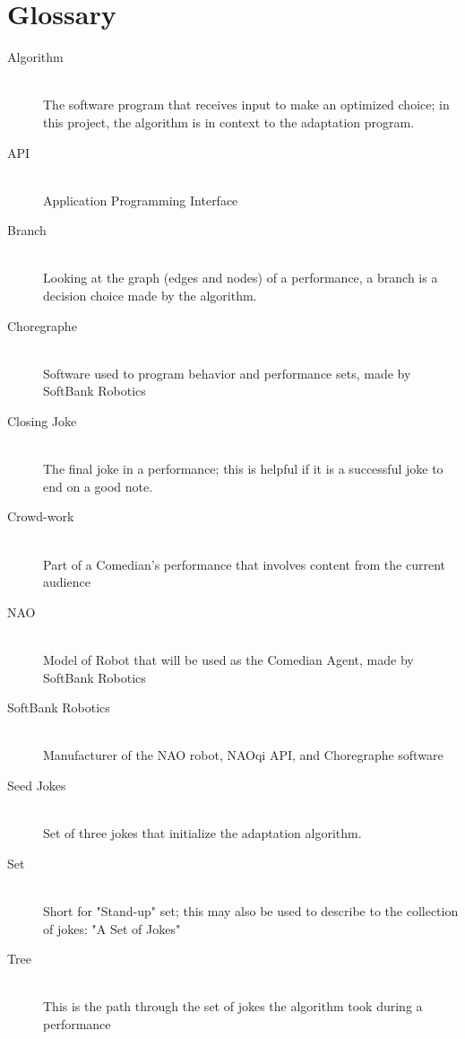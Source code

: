 \documentclass[onecolumn, draftclsnofoot,10pt, compsoc]{IEEEtran}
\begin{document}
\pagebreak

\pagebreak
\clearpage
\section{Glossary}
\begin{description}
  \item [Algorithm] \hfill \\ The software program that receives input to make an optimized choice; in this project, the algorithm is in context to the adaptation program.
  \item [API] \hfill \\ Application Programming Interface
  \item [Branch] \hfill \\Looking at the graph (edges and nodes) of a performance, a branch is a decision choice made by the algorithm.
  \item [Choregraphe] \hfill \\ Software used to program behavior and performance sets, made by SoftBank Robotics
  \item [Closing Joke] \hfill \\The final joke in a performance; this is helpful if it is a successful joke to end on a good note.
  \item [Crowd-work] \hfill \\ Part of a Comedian's performance that involves content from the current audience
  \item [NAO] \hfill \\ Model of Robot that will be used as the Comedian Agent, made by SoftBank Robotics
  \item [SoftBank Robotics] \hfill \\ Manufacturer of the NAO robot, NAOqi API, and Choregraphe software
  \item [Seed Jokes] \hfill \\ Set of three jokes that initialize the adaptation algorithm.
  \item [Set] \hfill \\Short for "Stand-up" set; this may also be used to describe to the collection of jokes: "A Set of Jokes"
  \item [Tree] \hfill \\This is the path through the set of jokes the algorithm took during a performance

\end{description}



\end{document}
